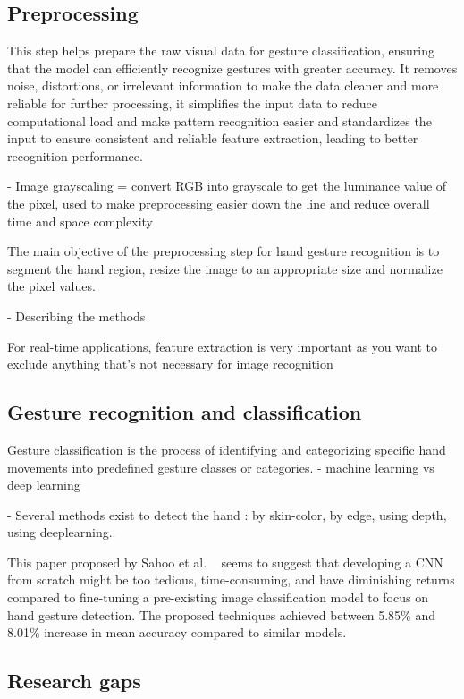 \documentclass[12pt]{article}
\begin{document}
  \subsection{Preprocessing}

  This step helps prepare the raw visual data for gesture classification, ensuring that the model can efficiently recognize gestures with greater accuracy. It removes noise, distortions, or irrelevant information to make the data cleaner and more reliable for further processing, it simplifies the input data to reduce computational load and make pattern recognition easier and standardizes the input to ensure consistent and reliable feature extraction, leading to better recognition performance.

  - Image grayscaling = convert RGB into grayscale to get the luminance value of the pixel, used to make preprocessing easier down the line and reduce overall time and space complexity

  The main objective of the preprocessing step for hand gesture recognition is to segment the hand region, resize the image to an appropriate size and normalize the pixel values.

  - Describing the methods

  For real-time applications, feature extraction is very important as you want to exclude anything that's not necessary for image recognition

  \subsection{Gesture recognition and classification}

  Gesture classification is the process of identifying and categorizing specific hand movements into predefined gesture classes or categories. 
  - machine learning vs deep learning

  - Several methods exist to detect the hand : by skin-color, by edge, using depth, using deeplearning..

  This paper proposed by Sahoo et al. ~\cite{sahoo2022real} seems to suggest that developing a CNN from scratch might be too tedious, time-consuming, and have diminishing returns compared to fine-tuning a pre-existing image classification model to focus on hand gesture detection. The proposed techniques achieved between 5.85\% and 8.01\% increase in mean accuracy compared to similar models.

  \subsection{Research gaps}
\end{document}
